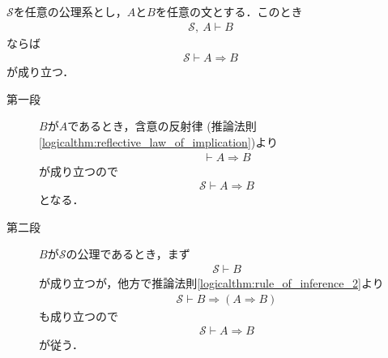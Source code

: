 	\begin{screen}
		\begin{metathm}[演繹法則]
			$\mathscr{S}$を任意の公理系とし，$A$と$B$を任意の文とする．このとき
			\begin{align}
				\mathscr{S},\ A \vdash B
			\end{align}
			ならば
			\begin{align}
				\mathscr{S} \vdash A \Longrightarrow B
			\end{align}
			が成り立つ．
		\end{metathm}
	\end{screen}
	
	\begin{metaprf}\mbox{}
		\begin{description}
			\item[第一段]
				$B$が$A$であるとき，含意の反射律
				(推論法則\ref{logicalthm:reflective_law_of_implication})より
				\begin{align}
					\vdash A \Longrightarrow B
				\end{align}
				が成り立つので
				\begin{align}
					\mathscr{S} \vdash A \Longrightarrow B
				\end{align}
				となる．
				
			\item[第二段]
				$B$が$\mathscr{S}$の公理であるとき，まず
				\begin{align}
					\mathscr{S} \vdash B
				\end{align}
				が成り立つが，他方で推論法則\ref{logicalthm:rule_of_inference_2}より
				\begin{align}
					\mathscr{S} \vdash B \Longrightarrow (A \Longrightarrow B) 
				\end{align}
				も成り立つので
				\begin{align}
					\mathscr{S} \vdash A \Longrightarrow B
				\end{align}
				が従う．
				

\end{description}
\end{metaprf}
